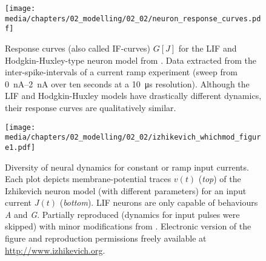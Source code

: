 \begin{figure}
	\centering
	\texttt{[image: media/chapters/02\_modelling/02\_02/neuron\_response\_curves.pdf]}%
	{\label{fig:neuron_response_curves_lif}}%
	{\label{fig:neuron_response_curves_hh}}%
	\caption[Response curves for the LIF and Hodgkin-Huxley-type neuron model]{Response curves (also called IF-curves) $G[J]$ for the LIF and Hodgkin-Huxley-type neuron model from . Data extracted from the inter-spike-intervals of a current ramp experiment (sweep from \SIrange{0}{2}{\nano\ampere} over ten seconds at a \SI{10}{\micro\second} resolution). Although the LIF and Hodgkin-Huxley models have drastically different dynamics, their response curves are qualitatively similar.}
	\label{fig:neuron_response_curves}
\end{figure}

\begin{figure}
	\centering
	\texttt{[image: media/chapters/02\_modelling/02\_02/izhikevich\_whichmod\_figure1.pdf]}%
	{\label{fig:izhikevich_whichmod_figure1a}}%
	{\label{fig:izhikevich_whichmod_figure1b}}%
	{\label{fig:izhikevich_whichmod_figure1c}}%
	{\label{fig:izhikevich_whichmod_figure1d}}%
	{\label{fig:izhikevich_whichmod_figure1e}}%
	{\label{fig:izhikevich_whichmod_figure1f}}%
	{\label{fig:izhikevich_whichmod_figure1g}}%
	{\label{fig:izhikevich_whichmod_figure1h}}%
	\caption[Diversity of neural dynamics for constant or ramp input currents]{Diversity of neural dynamics for constant or ramp input currents. Each plot depicts membrane-potential traces $v(t)$ (\emph{top}) of the Izhikevich neuron model (with different parameters) for an input current $J(t)$ (\emph{bottom}). LIF neurons are only capable of behaviours \emph{A} and \emph{G}. Partially reproduced (dynamics for input pulses were skipped) with minor modifications from \citet{izhikevich2004which}. Electronic version of the figure and reproduction permissions freely available at \url{http://www.izhikevich.org}.}
	\label{fig:izhikevich_whichmod_figure1}
\end{figure}

